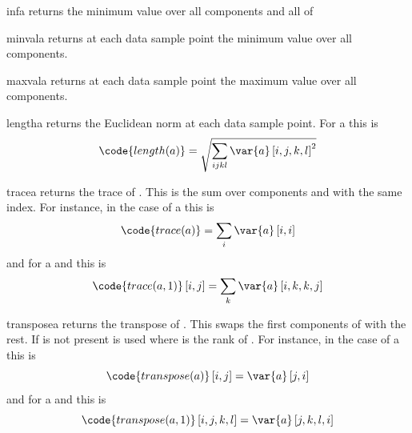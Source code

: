 \begin{funcdesc}{inf}{a}
returns the minimum value over all components and all \DataSamplePoints of 
\end{funcdesc}

\begin{funcdesc}{minval}{a}
returns at each data sample point the minimum value over all components.
\end{funcdesc}

\begin{funcdesc}{maxval}{a}
returns at each data sample point the maximum value over all components.
\end{funcdesc}

\begin{funcdesc}{length}{a}
returns the Euclidean norm at each data sample point.
For a \RankFour {} this is
\begin{equation}
\code{length(a)}=\sqrt{\sum_{ijkl} \var{a} \left[i,j,k,l\right]^2}
\end{equation}
\end{funcdesc}

\begin{funcdesc}{trace}{a}
returns the trace of . This is the sum over components 
and  with the same index.
For instance, in the case of a \RankTwo this is
\begin{equation}
\code{trace(a)}=\sum_{i} \var{a} \left[i,i\right]
\end{equation}
and for a \RankFour and  this is
\begin{equation}
\code{trace(a,1)}\left[i,j\right]=\sum_{k} \var{a} \left[i,k,k,j\right]
\end{equation}
\end{funcdesc}

\begin{funcdesc}{transpose}{a}
returns the transpose of . This swaps the first 
components of  with the rest. If  is not
present  is used where  is the rank of .
For instance, in the case of a \RankTwo this is
\begin{equation}
\code{transpose(a)}\left[i,j\right]=\var{a} \left[j,i\right]
\end{equation}
and for a \RankFour and  this is
\begin{equation}
\code{transpose(a,1)}\left[i,j,k,l\right]=\var{a} \left[j,k,l,i\right]
\end{equation}
\end{funcdesc}

